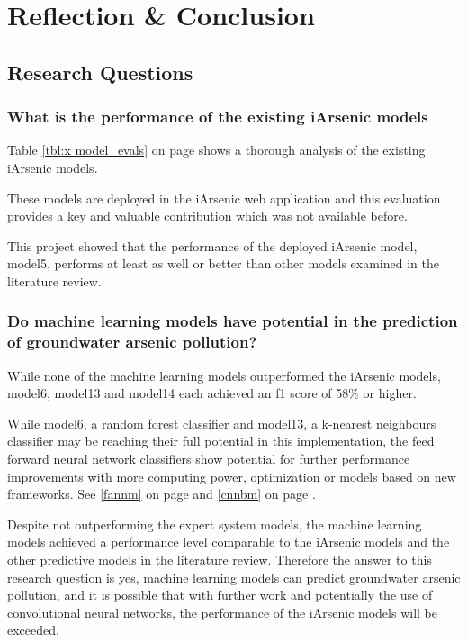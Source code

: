 \chapter{Reflection \& Conclusion}

\section{Research Questions}

\subsection{What is the performance of the existing iArsenic models}

Table \ref{tbl:x model_evals} on page \pageref{tbl:x model_evals} shows a thorough analysis of the existing iArsenic models.

These models are deployed in the iArsenic web application and this evaluation provides a key and valuable contribution which was not available before.

This project showed that the performance of the deployed iArsenic model, model5, performs at least as well or better than other models examined in the literature review.

\subsection{Do machine learning models have potential in the prediction of groundwater arsenic pollution?}

While none of the machine learning models outperformed the iArsenic models, model6, model13 and model14 each achieved an f1 score of 58\% or higher.

While model6, a random forest classifier and model13, a k-nearest neighbours classifier may be reaching their full potential in this implementation, the feed forward neural network classifiers show potential for further performance improvements with more computing power, optimization or models based on new frameworks. See \ref{fannm} on page \pageref{fannm} and \ref{cnnbm} on page \pageref{cnnbm}.

Despite not outperforming the expert system models, the machine learning models achieved a performance level comparable to the iArsenic models and the other predictive models in the literature review. Therefore the answer to this research question is yes, machine learning models can predict groundwater arsenic pollution, and it is possible that with further work and potentially the use of convolutional neural networks, the performance of the iArsenic models will be exceeded.

